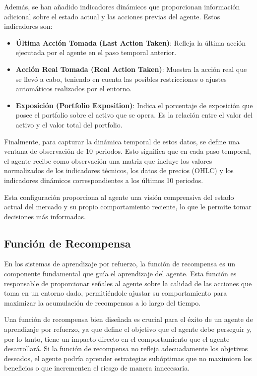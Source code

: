 \documentclass[a4paper,12pt, twoside]{report}
\begin{document}
Además, se han añadido indicadores dinámicos que proporcionan información adicional sobre 
el estado actual y las acciones previas del agente. Estos indicadores son:

\begin{itemize}
    \item \textbf{Última Acción Tomada (Last Action Taken)}: Refleja la última acción ejecutada 
    por el agente en el paso temporal anterior.

    \item \textbf{Acción Real Tomada (Real Action Taken)}: Muestra la acción real que se llevó a cabo, 
    teniendo en cuenta las posibles restricciones o ajustes automáticos realizados por el entorno.

    \item \textbf{Exposición (Portfolio Exposition)}: Indica el porcentaje de exposición que posee el portfolio
    sobre el activo que se opera. Es la relación entre el valor del activo y el valor total del portfolio.
\end{itemize}

Finalmente, para capturar la dinámica temporal de estos datos, se define una ventana de observación 
de 10 periodos. Esto significa que en cada paso temporal, el agente recibe como observación una 
matriz que incluye los valores normalizados de los indicadores técnicos, los datos de precios (OHLC) 
y los indicadores dinámicos correspondientes a los últimos 10 periodos. 

Esta configuración proporciona al agente una visión comprensiva del estado actual del mercado y 
su propio comportamiento reciente, lo que le permite tomar decisiones más informadas.

\subsection{Función de Recompensa}

En los sistemas de aprendizaje por refuerzo, la función de recompensa es un componente fundamental 
que guía el aprendizaje del agente. Esta función es responsable de proporcionar señales al agente 
sobre la calidad de las acciones que toma en un entorno dado, permitiéndole ajustar su comportamiento 
para maximizar la acumulación de recompensas a lo largo del tiempo. 

Una función de recompensa bien diseñada es crucial para el éxito de un agente de aprendizaje por 
refuerzo, ya que define el objetivo que el agente debe perseguir y, por lo tanto, tiene un impacto 
directo en el comportamiento que el agente desarrollará. Si la función de recompensa no refleja 
adecuadamente los objetivos deseados, el agente podría aprender estrategias subóptimas que no 
maximicen los beneficios o que incrementen el riesgo de manera innecesaria.
\end{document}
